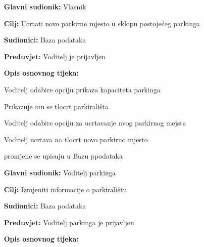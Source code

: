 \begin{packed_item}
\begin{packed_item}
\begin{packed_item}
\begin{packed_enum}
						\end{packed_enum}
					\end{packed_item}

                        \noindent {}
					\begin{packed_item}
	
						\item \textbf{Glavni sudionik: }Vlasnik
						\item  \textbf{Cilj:} Ucrtati novo parkirno mjesto u sklopu postojećeg parkinga
						\item  \textbf{Sudionici:} Baza podataka
						\item  \textbf{Preduvjet:} Voditelj je prijavljen
						\item  \textbf{Opis osnovnog tijeka:}
						
						\item[] \begin{packed_enum}
	
							\item Voditelj odabire opciju prikaza kapaciteta parkinga
							\item Prikazuje mu se tlocrt parkirališta
							\item Voditelj odabire opciju za ucrtavanje nvog parkirnog mejsta
                                \item Voditelj ucrtava na tlocrt novo parkirno mjesto
                                \item promjene se upisuju u Bazu ppodataka
							
						\end{packed_enum}
					\end{packed_item}

                        \noindent {}
					\begin{packed_item}
	
						\item \textbf{Glavni sudionik: }Voditelj parkinga
						\item  \textbf{Cilj:} Izmjeniti informacije o parkiralištu
						\item  \textbf{Sudionici:} Baza podataka
						\item  \textbf{Preduvjet:} Voditelj parkinga je prijavljen
						\item  \textbf{Opis osnovnog tijeka:}
						
						\item[] \begin{packed_enum}
	

\end{packed_enum}
\end{packed_item}
\end{packed_item}
\end{packed_item}
